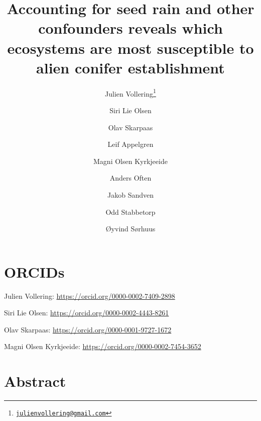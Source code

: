 \documentclass[
]{article}
\title{Accounting for seed rain and other confounders reveals which ecosystems are most susceptible to alien conifer establishment}
\author{Julien Vollering\footnote{\href{mailto:julienvollering@gmail.com}{\nolinkurl{julienvollering@gmail.com}}} \and Siri Lie Olsen \and Olav Skarpaas \and Leif Appelgren \and Magni Olsen Kyrkjeeide \and Anders Often \and Jakob Sandven \and Odd Stabbetorp \and Øyvind Sørhuus}
\date{}
\begin{document}
\maketitle

{
\setcounter{tocdepth}{2}
\tableofcontents
}
\hypertarget{orcids}{%
\section{ORCIDs}\label{orcids}}

Julien Vollering: \url{https://orcid.org/0000-0002-7409-2898}

Siri Lie Olsen: \url{https://orcid.org/0000-0002-4443-8261}

Olav Skarpaas: \url{https://orcid.org/0000-0001-9727-1672}

Magni Olsen Kyrkjeeide: \url{https://orcid.org/0000-0002-7454-3652}

\hypertarget{abstract}{%
\section{Abstract}\label{abstract}}
\end{document}
